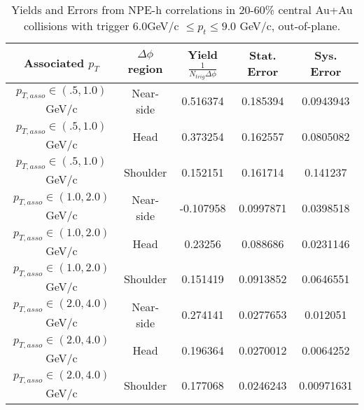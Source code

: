 \begin{table}
\centering
\begin{tabular}{|c|c|c|c|c|}
\hline
Associated $p_T$    & $\Delta\phi$ region & Yield $\frac{1}{N_{trig} \Delta\phi}$ & Stat. Error & Sys. Error\\
\hline
$p_{T,asso} \in(.5, 1.0)$ GeV/c  & Near-side & 0.516374 & 0.185394 & 0.0943943 \\
\hline
$p_{T,asso} \in(.5, 1.0)$ GeV/c  & Head & 0.373254 & 0.162557 & 0.0805082 \\
\hline
$p_{T,asso} \in(.5, 1.0)$ GeV/c  & Shoulder & 0.152151 & 0.161714 & 0.141237 \\
\hline
$p_{T,asso} \in(1.0, 2.0)$ GeV/c  & Near-side & -0.107958 & 0.0997871 & 0.0398518 \\
\hline
$p_{T,asso} \in(1.0, 2.0)$ GeV/c  & Head & 0.23256 & 0.088686 & 0.0231146 \\
\hline
$p_{T,asso} \in(1.0, 2.0)$ GeV/c  & Shoulder & 0.151419 & 0.0913852 & 0.0646551 \\
\hline
$p_{T,asso} \in(2.0, 4.0)$ GeV/c  & Near-side & 0.274141 & 0.0277653 & 0.012051 \\
\hline
$p_{T,asso} \in(2.0, 4.0)$ GeV/c  & Head & 0.196364 & 0.0270012 & 0.0064252 \\
\hline
$p_{T,asso} \in(2.0, 4.0)$ GeV/c  & Shoulder & 0.177068 & 0.0246243 & 0.00971631 \\
\hline
\end{tabular}
\caption[Yields and Errors in Au+Au Correlations, Out-of-Plane, 20-60\%, High Trigger]{Yields and Errors from NPE-h correlations in 20-60\% central Au+Au collisions with trigger $6.0 $GeV/c $\leq p_t \leq 9.0$ GeV/c, out-of-plane.}
\label{tab:OutPlaneHigh}
\end{table}

